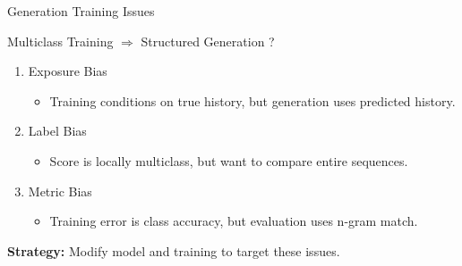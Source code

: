

\begin{frame}{Generation Training Issues}

  \begin{center}
    Multiclass Training $\Rightarrow$ Structured Generation ?
  \end{center}

  \pause
  \begin{enumerate}
  \item Exposure Bias
    \begin{itemize}
    \item Training conditions on true history, but generation uses predicted history.
    \end{itemize}
    \air
    \pause

  \item Label Bias  %
    \begin{itemize}
    \item Score is locally multiclass, but  want to compare entire sequences.
    \end{itemize}
    \air
    \pause


  \item Metric Bias
    \begin{itemize}
    \item Training error is class accuracy, but evaluation uses n-gram match.
    \end{itemize}
  \end{enumerate}
  \pause
  \begin{center}
    \textbf{Strategy:} Modify model and training to target these issues.
  \end{center}
\end{frame}








